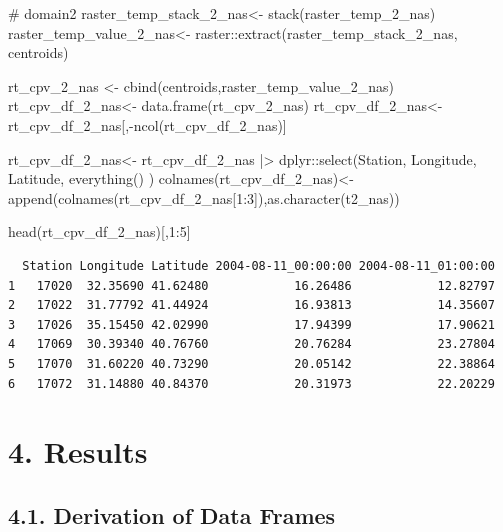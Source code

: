 \documentclass[
  letterpaper,
  DIV=11,
  numbers=noendperiod,
  abstract]{scrartcl}
\newenvironment{Shaded}{\begin{snugshade}}{\end{snugshade}}
\newcommand{\CommentTok}[1]{\textcolor[rgb]{0.37,0.37,0.37}{#1}}
\newcommand{\DecValTok}[1]{\textcolor[rgb]{0.68,0.00,0.00}{#1}}
\newcommand{\FunctionTok}[1]{\textcolor[rgb]{0.28,0.35,0.67}{#1}}
\newcommand{\NormalTok}[1]{\textcolor[rgb]{0.00,0.23,0.31}{#1}}
\newcommand{\OtherTok}[1]{\textcolor[rgb]{0.00,0.23,0.31}{#1}}
\newcommand{\SpecialCharTok}[1]{\textcolor[rgb]{0.37,0.37,0.37}{#1}}
\begin{document}
\begin{Shaded}
\begin{Highlighting}[]
\CommentTok{\# domain2}
\NormalTok{raster\_temp\_stack\_2\_nas}\OtherTok{\textless{}{-}} \FunctionTok{stack}\NormalTok{(raster\_temp\_2\_nas)}
\NormalTok{raster\_temp\_value\_2\_nas}\OtherTok{\textless{}{-}}\NormalTok{ raster}\SpecialCharTok{::}\FunctionTok{extract}\NormalTok{(raster\_temp\_stack\_2\_nas, centroids)}

\NormalTok{rt\_cpv\_2\_nas }\OtherTok{\textless{}{-}} \FunctionTok{cbind}\NormalTok{(centroids,raster\_temp\_value\_2\_nas)}
\NormalTok{rt\_cpv\_df\_2\_nas}\OtherTok{\textless{}{-}} \FunctionTok{data.frame}\NormalTok{(rt\_cpv\_2\_nas) }
\NormalTok{rt\_cpv\_df\_2\_nas}\OtherTok{\textless{}{-}}\NormalTok{ rt\_cpv\_df\_2\_nas[,}\SpecialCharTok{{-}}\FunctionTok{ncol}\NormalTok{(rt\_cpv\_df\_2\_nas)]}

\NormalTok{rt\_cpv\_df\_2\_nas}\OtherTok{\textless{}{-}} 
\NormalTok{  rt\_cpv\_df\_2\_nas }\SpecialCharTok{|\textgreater{}} 
\NormalTok{  dplyr}\SpecialCharTok{::}\FunctionTok{select}\NormalTok{(Station, Longitude, Latitude,  }\FunctionTok{everything}\NormalTok{() )}
\FunctionTok{colnames}\NormalTok{(rt\_cpv\_df\_2\_nas)}\OtherTok{\textless{}{-}} \FunctionTok{append}\NormalTok{(}\FunctionTok{colnames}\NormalTok{(rt\_cpv\_df\_2\_nas[}\DecValTok{1}\SpecialCharTok{:}\DecValTok{3}\NormalTok{]),}\FunctionTok{as.character}\NormalTok{(t2\_nas))}

\FunctionTok{head}\NormalTok{(rt\_cpv\_df\_2\_nas)[,}\DecValTok{1}\SpecialCharTok{:}\DecValTok{5}\NormalTok{]}
\end{Highlighting}
\end{Shaded}

\begin{verbatim}
  Station Longitude Latitude 2004-08-11_00:00:00 2004-08-11_01:00:00
1   17020  32.35690 41.62480            16.26486            12.82797
2   17022  31.77792 41.44924            16.93813            14.35607
3   17026  35.15450 42.02990            17.94399            17.90621
4   17069  30.39340 40.76760            20.76284            23.27804
5   17070  31.60220 40.73290            20.05142            22.38864
6   17072  31.14880 40.84370            20.31973            22.20229
\end{verbatim}

\hypertarget{results}{%
\section{4. Results}\label{results}}

\hypertarget{derivation-of-data-frames}{%
\subsection{4.1. Derivation of Data
Frames}\label{derivation-of-data-frames}}
\end{document}
